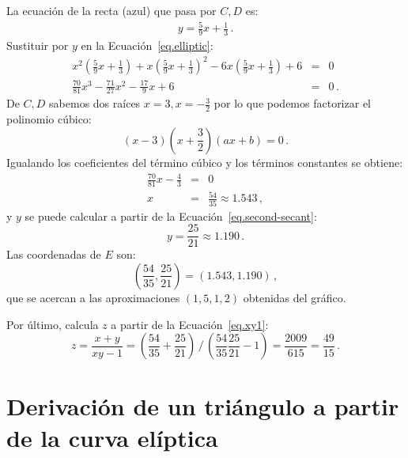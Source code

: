 La ecuación de la recta (azul) que pasa por $C,D$ es:
\begin{align}
y = \frac{5}{9}x + \frac{1}{3}\,.\label{eq.second-secant}
\end{align}
Sustituir por $y$ en la Ecuación~\ref{eq.elliptic}:
\begin{eqnarray*}
x^2\left(\frac{5}{9}x + \frac{1}{3}\right) + x\left(\frac{5}{9}x + \frac{1}{3}\right)^2 -6x\left(\frac{5}{9}x + \frac{1}{3}\right) +6 &=&0\\
\frac{70}{81}x^3 - \frac{71}{27}x^2 - \frac{17}{9}x +6 &=&0\,.
\end{eqnarray*}
De $C,D$ sabemos dos raíces $x=3,x=-\frac{3}{2}$ por lo que podemos factorizar el polinomio cúbico:
\[
(x-3)\left(x+\frac{3}{2}\right)(ax+b)=0\,.
\]
Igualando los coeficientes del término cúbico y los términos constantes se obtiene:
\begin{eqnarray*}
\frac{70}{81}x - \frac{4}{3}&=&0\\
x&=& \frac{54}{35}\approx 1.543\,,
\end{eqnarray*}
y $y$ se puede calcular a partir de la Ecuación~\ref{eq.second-secant}:
\[
y=\frac{25}{21}\approx 1.190\,.
\]
Las coordenadas de $E$ son:
\[
\left(\frac{54}{35}, \frac{25}{21}\right)=(1.543,1.190)\,,
\]
que se acercan a las aproximaciones $(1,5,1,2)$ obtenidas del gráfico.

Por último, calcula $z$ a partir de la Ecuación~\ref{eq.xy1}:
\[
z=\frac{x+y}{xy-1}=%
\displaystyle\left(\frac{54}{35} + \frac{25}{21}\right)%
 \, \bigg/ \,%
\displaystyle\left(\frac{54}{35}\frac{25}{21}-1\right)=%
\frac{2009}{615} = \frac{49}{15}\,.
\]

\section{Derivación de un triángulo a partir de la curva elíptica}

